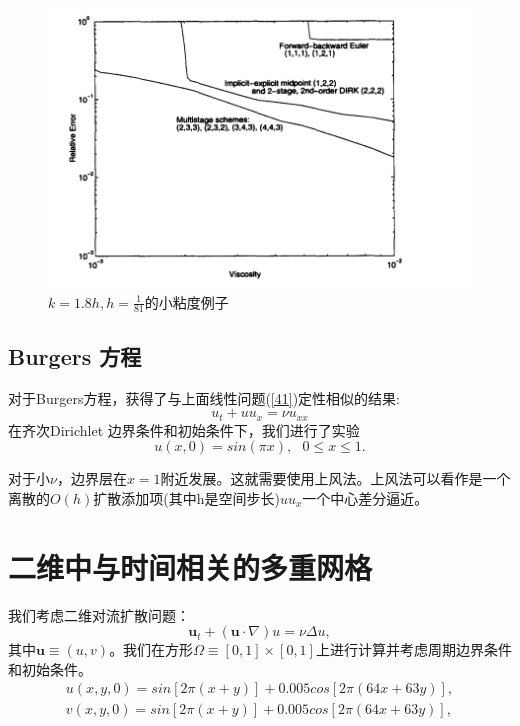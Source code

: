 \documentclass[12pt,a4paper]{article}
\begin{document}
\begin{figure}[H]
\includegraphics[width=15cm]{./figures/5.png}
\caption{$k=1.8h,h=\frac{1}{81}$的小粘度例子}
\centering
\label{figures5}
\end{figure}

\subsection{Burgers 方程}
对于Burgers方程，获得了与上面线性问题(\ref{41})定性相似的结果:
\begin{equation}
u_{t}+uu_{x}=\nu u_{xx}
\end{equation}
在齐次Dirichlet 边界条件和初始条件下，我们进行了实验
\begin{equation*}
u(x,0)=sin(\pi x),~~~0\le x\le 1.
\end{equation*}

对于小$\nu $，边界层在$x =1$附近发展。这就需要使用上风法。上风法可以看作是一个离散的$O(h)$扩散添加项(其中h是空间步长)$uu_{x}$一个中心差分逼近。

\section{二维中与时间相关的多重网格}

我们考虑二维对流扩散问题：
\begin{equation}
\mathbf{u}_{t}+(\mathbf{u}\cdot\nabla)u=\nu \Delta u,
\label{51}
\end{equation}
其中$\mathbf{u}\equiv (u,v)$。我们在方形$\varOmega\equiv [0,1]\times [0,1]$上进行计算并考虑周期边界条件和初始条件。
\begin{gather*}
u(x,y,0)=sin[2\pi (x+y)]+0.005cos[2\pi (64x+63y)],\\
v(x,y,0)=sin[2\pi (x+y)]+0.005cos[2\pi (64x+63y)],
\end{gather*}
\end{document}
